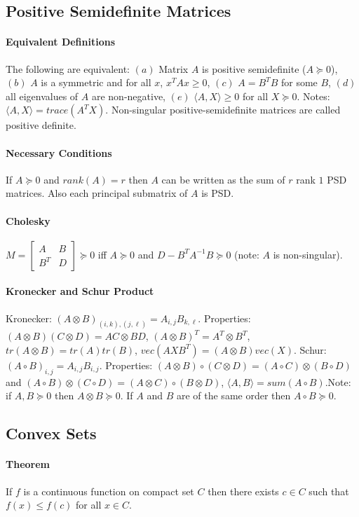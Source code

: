\documentclass[letterpaper,11pt,oneside,onecolumn]{article}
\begin{document}
\subsection*{Positive Semidefinite Matrices}
\paragraph{Equivalent Definitions} The following are equivalent: $(a)$ Matrix $A$ is positive semidefinite ($A\succcurlyeq 0$), $(b)$ $A$ is a symmetric and for all $x$, $x^TAx \geq 0$, $(c)$ $A = B^TB$ for some $B$, $(d)$ all eigenvalues of $A$ are non-negative, $(e)$ $\langle A, X\rangle \geq
 0$ for all $X \succcurlyeq 0$. Notes: $\langle A, X\rangle = trace(A^TX)$. Non-singular positive-semidefinite matrices are called positive definite.
 \paragraph{Necessary Conditions}
 If $A \succcurlyeq 0$ and $rank(A) = r$ then $A$ can be written as the sum of $r$ rank $1$ PSD matrices. Also each principal submatrix of $A$ is PSD.
 \paragraph{Cholesky} $M = \begin{bmatrix} A & B \\  B^T &D\end{bmatrix} \succcurlyeq 0$ iff $A \succcurlyeq 0$ and $D - B^TA^{-1}B \succcurlyeq 0$ (note: $A$ is non-singular).
\paragraph{Kronecker and Schur Product}Kronecker: $(A \otimes B)_{(i,k),(j,\ell)} = A_{i,j}B_{k,\ell}$. Properties: $(A\otimes B)(C\otimes D) = AC \otimes BD$, $(A\otimes B)^T = A^T \otimes B^T$, $tr(A \otimes B)= tr(A) tr(B)$, $vec(AXB^T) = (A\otimes B)vec(X)$. Schur: $(A \circ B)_{i,j} = A_{i,j}B_{i,j}$. Properties: $(A\otimes B) \circ(C\otimes D) = (A\circ C) \otimes (B \circ D)$ and $(A \circ B)\otimes(C\circ D) = (A\otimes C) \circ(B \otimes D)$, $\langle A, B \rangle = sum(A \circ B)$.Note: if $A, B\succcurlyeq 0$ then $A\otimes B \succcurlyeq 0$. If $A$ and $B$ are of the same order then $A\circ B \succcurlyeq 0$.
\subsection*{Convex Sets}
\paragraph{Theorem} If $f$ is a continuous function on compact set $C$ then there exists $c\in C$ such that $f(x) \leq f(c)$ for all $x \in C$.
\end{document}
